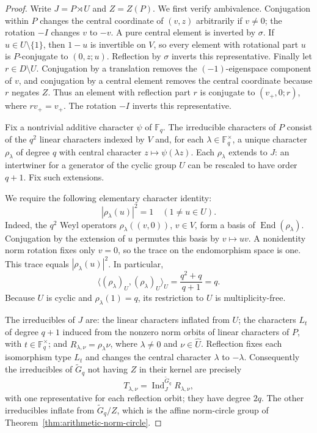\documentclass[11pt,a4paper]{amsart}
\theoremstyle{definition}
\theoremstyle{remark}
\numberwithin{equation}{section}
\begin{document}
\begin{proof}
Write $J=P\rtimes U$ and $Z=Z(P)$.
We first verify ambivalence. Conjugation within $P$ changes the
central coordinate of $(v,z)$ arbitrarily if $v\ne0$; the rotation
$-I$ changes $v$ to $-v$. A pure central element is inverted by
$\sigma$. If $u\in U\setminus\{1\}$, then $1-u$ is invertible on
$V$, so every element with rotational part $u$ is $P$-conjugate to
$(0,z;u)$. Reflection by $\sigma$ inverts this representative.
Finally let $r\in D\setminus U$. Conjugation by a translation
removes the $(-1)$-eigenspace component of $v$, and conjugation by
a central element removes the central coordinate because $r$
negates $Z$. Thus an element with reflection part $r$ is conjugate
to $(v_+,0;r)$, where $rv_+=v_+$. The rotation $-I$ inverts this
representative.

Fix a nontrivial additive character $\psi$ of $\mathbb F_q$.
The irreducible characters of $P$ consist of the $q^2$ linear
characters indexed by $V$ and, for each $\lambda\in\mathbb F_q^\times$,
a unique character $\rho_\lambda$ of degree $q$ with central
character $z\mapsto\psi(\lambda z)$. Each $\rho_\lambda$ extends
to $J$: an intertwiner for a generator of the cyclic group $U$
can be rescaled to have order $q+1$. Fix such extensions.

We require the following elementary character identity:
\begin{equation}\label{eq:circle-schrodinger-trace}
 |\rho_\lambda(u)|^2=1
 \quad(1\ne u\in U).
\end{equation}
Indeed, the $q^2$ Weyl operators
$\rho_\lambda((v,0))$, $v\in V$, form a basis of
$\operatorname{End}(\rho_\lambda)$. Conjugation by the extension
of $u$ permutes this basis by $v\mapsto uv$. A nonidentity norm
rotation fixes only $v=0$, so the trace on the endomorphism space
is one. This trace equals $|\rho_\lambda(u)|^2$.
In particular,
\[
 \langle(\rho_\lambda)_U,(\rho_\lambda)_U\rangle_U
 =\frac{q^2+q}{q+1}=q.
\]
Because $U$ is cyclic and $\rho_\lambda(1)=q$, its restriction to
$U$ is multiplicity-free.

The irreducibles of $J$ are: the linear characters inflated from
$U$; the characters $L_t$ of degree $q+1$ induced from the nonzero
norm orbits of linear characters of $P$, with
$t\in\mathbb F_q^\times$; and
$R_{\lambda,\nu}=\rho_\lambda\nu$, where
$\lambda\ne0$ and $\nu\in\widehat U$.
Reflection fixes each isomorphism type $L_t$ and changes the
central character $\lambda$ to $-\lambda$.
Consequently the irreducibles of $\widetilde G_q$ not having $Z$
in their kernel are precisely
\[
 T_{\lambda,\nu}
 =\operatorname{Ind}_{J}^{\widetilde G_q}R_{\lambda,\nu},
\]
with one representative for each reflection orbit; they have
degree $2q$. The other irreducibles inflate from
$\widetilde G_q/Z$, which is the affine norm-circle group of
Theorem~\ref{thm:arithmetic-norm-circle}.


\end{proof}
\end{document}
